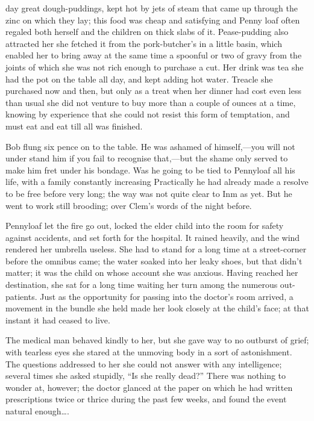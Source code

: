 {\protect\hypertarget{43}{}{}}day great dough-puddings, kept hot by jets
of steam that came up through the zinc on which they lay; this food was
cheap and satisfying and Penny loaf often regaled both herself and the
children on thick slabs of it. Pease-pudding also attracted her she
fetched it from the pork-butcher's in a little basin, which enabled her
to bring away at the same time a spoonful or two of gravy from the
joints of which she was not rich enough to purchase a cut. Her drink was
tea she had the pot on the table all day, and kept adding hot water.
Treacle she purchased now and then, but only as a treat when her dinner
had cost even less than usual she did not venture to buy more than a
couple of ounces at a time, knowing by experience that she could not
resist this form of temptation, and must eat and eat till all was
finished.

Bob flung six pence on to the table. He was ashamed of himself,---you
will not under stand him if you fail to recognise that,---but the shame
only served to make him fret under his bondage. Was he going to be tied
to Pennyloaf all his life, with a family constantly increasing
Practically he had already made {\protect\hypertarget{44}{}{}}a resolve
to be free before very long; the way was not quite clear to Inm as yet.
But he went to work still brooding; over Clem's words of the night
before.

Pennyloaf let the fire go out, locked the elder child into the room for
safety against accidents, and set forth for the hospital. It rained
heavily, and the wind rendered her umbrella useless. She had to stand
for a long time at a street-corner before the omnibus came; the water
soaked into her leaky shoes, but that didn't matter; it was the child on
whose account she was anxious. Having reached her destination, she sat
for a long time waiting her turn among the numerous out-patients. Just
as the opportunity for passing into the doctor's room arrived, a
movement in the bundle she held made her look closely at the child's
face; at that instant it had ceased to live.

The medical man behaved kindly to her, but she gave way to no outburst
of grief; with tearless eyes she stared at the unmoving body in a sort
of astonishment. The questions addressed to her she could not answer
with any intelligence; several times she asked
{\protect\hypertarget{45}{}{}}stupidly, ``Is she really dead?'' There
was nothing to wonder at, however; the doctor glanced at the paper on
which he had written prescriptions twice or thrice during the past few
weeks, and found the event natural enough\ldots{}.

